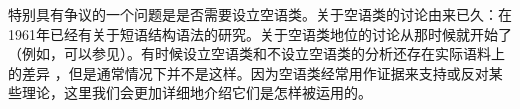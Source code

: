 特别具有争议的一个问题是是否需要设立空语类。关于空语类的讨论由来已久：在1961年已经有关于短语结构语法的研究\citep*{BHPS61a}。关于空语类地位的讨论从那时候就开始了（例如，可以参见\citealp*{Loebner86a,Wunderlich87d,Wunderlich89,Stechow89,Haider97a,Sag2000a,BMS2001a,LH2006a,Mueller2004e,AS2015a}）。有时候设立空语类和不设立空语类的分析还存在实际语料上的差异 \citep{AS2015a}，但是通常情况下并不是这样。因为空语类经常用作证据来支持或反对某些理论，这里我们会更加详细地介绍它们是怎样被运用的。

